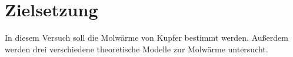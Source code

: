 \section{Zielsetzung}
\label{sec:zielsetzung}
In diesem Versuch soll die Molwärme von Kupfer bestimmt werden. Außerdem werden drei verschiedene theoretische Modelle zur Molwärme untersucht.

